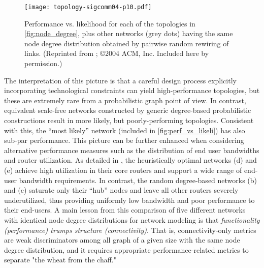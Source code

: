 \begin{figure}[thbp] 
  \begin{center}
    \texttt{[image: topology-sigcomm04-p10.pdf]}
     \caption{Performance vs. likelihood for each of the topologies in \autoref{fig:node_degree}, plus 
	 other networks (grey dots) having the same node degree
         distribution obtained by pairwise 	 random rewiring of
         links. 
	 (Reprinted from \cite{Li04}; \copyright 2004 ACM, Inc. Included here by
         permission.)
         \label{fig:perf_vs_likeli}}
  \end{center}
\end{figure}         

The interpretation of this picture is that a careful design process
explicitly incorporating technological constraints can yield
high-performance topologies, but these are extremely rare from a
probabilistic graph point of view. In contrast, equivalent scale-free
networks constructed by generic degree-based probabilistic
constructions result in more likely, but poorly-performing
topologies. Consistent with this, the ``most likely'' network
(included in \autoref{fig:perf_vs_likeli}) has also sub-par performance. This picture can be
further enhanced when considering alternative performance measures
such as the distribution of end user bandwidths and router
utilization. As detailed in \cite{Li04}, the heuristically optimal
networks (d) and (e) achieve high utilization in their core routers
and support a wide range of end-user bandwidth requirements. In
contrast, the random degree-based networks (b) and (c) saturate only
their ``hub'' nodes and leave all other routers severely
underutilized, thus providing uniformly low bandwidth and poor
performance to their end-users. A main lesson from this comparison of
five different networks with identical node degree distributions for
network modeling is that {\it functionality (\eg performance) trumps structure (\eg connectivity)}. That is, connectivity-only metrics
are weak discriminators among all graph of a given size with the same
node degree distribution, and it requires appropriate
performance-related metrics to separate "the wheat from the chaff."
 
